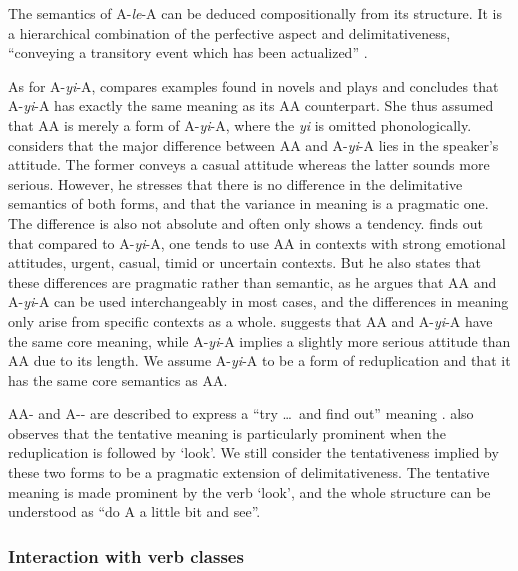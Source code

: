 The semantics of A-\textit{le}-A can be deduced compositionally from its structure. 
It is a hierarchical combination of the perfective aspect and delimitativeness, ``conveying a transitory event which has been actualized'' \citep[151]{XiaoMcEnery2004}.


As for A-\textit{yi}-A, \citet[273]{Fan1964} compares examples found in novels and plays and concludes that A-\textit{yi}-A has exactly the same meaning as its AA counterpart.
She thus assumed that AA is merely a form of A-\textit{yi}-A, where the \textit{yi} is omitted phonologically.
\citet[Sec. 5]{Xing2000} considers that the major  difference  between AA and A-\textit{yi}-A lies in the speaker's attitude.
The former conveys a casual attitude whereas the latter sounds more serious. %
However, he stresses that there is no difference in the delimitative semantics of both forms,
and that the variance in meaning is a pragmatic one.
The difference is also not absolute and often only shows a tendency.
\citet{Xu2002} finds out that compared to A-\textit{yi}-A, one tends to use AA in contexts with strong emotional attitudes, urgent, casual, timid or uncertain contexts.
But he also states that these differences are pragmatic rather than semantic, 
as he argues that AA and A-\textit{yi}-A can be used interchangeably in most cases,
and the differences in meaning only arise from specific contexts as a whole.
\citet[15]{Yang2003} suggests that AA and A-\textit{yi}-A have the same core meaning, while A-\textit{yi}-A implies a slightly more serious attitude than AA due to its length.
We assume A-\textit{yi}-A to be a form of reduplication and that it has the same core semantics as AA.

AA- and A-- are described to express a ``try \ldots\, and find out'' meaning \citep[63]{Cheng2012}.
\citet[290]{Tsao2001} also observes that the tentative meaning is particularly prominent when the reduplication is followed by  `look'.
We still consider the tentativeness implied by these two forms to be a pragmatic extension of delimitativeness.
The tentative meaning is made prominent by the verb  `look',
and the whole structure can be understood as ``do A a little bit and see''.




\subsubsection{Interaction with verb classes}\label{sec:Aktionsarten}


